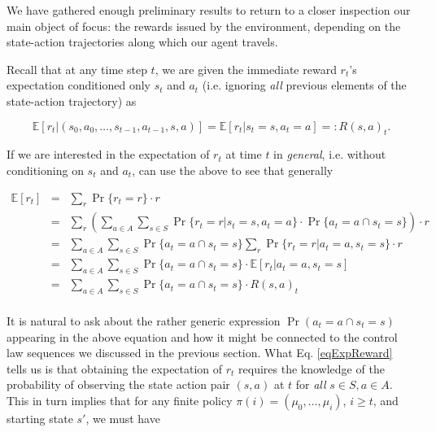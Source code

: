 \documentclass[11pt]{article} %
\begin{document}
We have gathered enough preliminary results to return to a closer inspection our main object of focus: the rewards issued by the environment, depending on the state-action trajectories along which our agent travels.

Recall that at any time step $t$, we are given the immediate reward $r_t$'s expectation conditioned only $s_t$ and $a_t$ (i.e. ignoring \textit{all} previous elements of the state-action trajectory) as

\begin{equation}
	\mathbb{E}[r_t | (s_0,a_0,\dots,s_{t-1},a_{t-1},s,a)] = \mathbb{E}[r_t | s_t = s, a_t = a] =: R(s,a)_t.
\end{equation}

If we are interested in the expectation of $r_t$ at time $t$ in \textit{general}, i.e. without conditioning on $s_t$ and $a_t$, can use the above to see that generally

\begin{equation}\label{eqExpReward}
	\begin{array}{rcl}
		\mathbb{E}[r_t]	& = &	\sum\limits_r \Pr\{r_t = r\} \cdot r \\
					& = & 	\sum\limits_r \left(\sum\limits_{a \in A} \sum\limits_{s \in S} \Pr\{r_t = r | s_t = s, a_t = a\} \cdot \Pr\{ a_t = a \cap s_t = s \} \right) \cdot r \\
					& = &	\sum\limits_{a \in A} \sum\limits_{s \in S} \Pr \{a_t = a \cap s_t = s\} \sum\limits_r \Pr \{r_t = r | a_t = a, s_t = s\} \cdot r \\
					& = &	\sum\limits_{a \in A} \sum\limits_{s \in S} \Pr \{a_t = a \cap s_t = s\} \cdot \mathbb{E}[r_t | a_t = a, s_t = s] \\
					& = &	\sum\limits_{a \in A} \sum\limits_{s \in S} \Pr \{a_t = a \cap s_t = s\} \cdot R(s,a)_t \\
	\end{array}
\end{equation}

It is natural to ask about the rather generic expression $\Pr(a_t = a \cap s_t = s)$ appearing in the above equation and how it might be connected to the control law sequences we discussed in the previous section. What Eq. \ref{eqExpReward} tells us is that obtaining the expectation of $r_t$ requires the knowledge of the probability of observing the state action pair $(s,a)$ at $t$ for \textit{all} $s \in S, a \in A$. This in turn implies that for any finite policy $\pi(i) = (\mu_0,\dots,\mu_i)$, $i \ge t$, and starting state $s'$, we must have 
\end{document}
